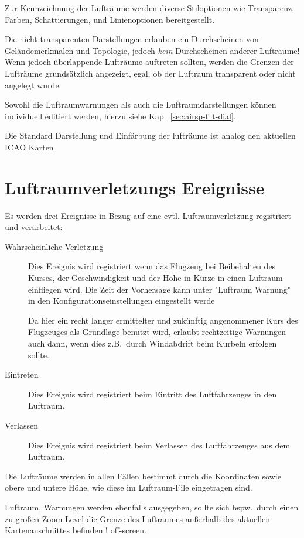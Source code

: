 Zur Kennzeichnung der Lufträume werden diverse Stiloptionen wie Transparenz, Farben,
Schattierungen, und Linienoptionen bereitgestellt. 

Die nicht-transparenten  Darstellungen erlauben ein Durchscheinen von
Geländemerkmalen und Topologie, jedoch \emph{kein} Durchscheinen anderer Lufträume!
Wenn jedoch überlappende Lufträume auftreten sollten, werden die Grenzen der
Lufträume grundsätzlich angezeigt, egal, ob der Luftraum transparent oder nicht angelegt wurde.

Sowohl die Luftraumwarnungen als auch die Luftraumdarstellungen können individuell editiert werden,
hierzu siehe Kap.~\ref{sec:airsp-filt-dial}.

Die Standard Darstellung und Einfärbung der lufträume ist analog den aktuellen ICAO Karten

\section{Luftraumverletzungs Ereignisse}

Es werden drei Ereignisse in Bezug auf eine evtl. Luftraumverletzung  registriert und verarbeitet:
\begin{description}
\item[Wahrscheinliche Verletzung] Dies Ereignis wird registriert
wenn das Flugzeug bei Beibehalten des Kurses, der Geschwindigkeit und der Höhe in Kürze in einen Luftraum einfliegen wird.
Die Zeit der Vorhersage kann unter "Luftraum Warnung" in den Konfigurationseinstellungen eingestellt werde

Da hier ein recht langer ermittelter und zukünftig angenommener Kurs des Flugzeuges als
 Grundlage benutzt wird, erlaubt \xc rechtzeitige Warnungen auch dann, wenn dies z.B.\
 durch Windabdrift beim Kurbeln erfolgen sollte.
\item[Eintreten] Dies Ereignis wird registriert beim Eintritt des Luftfahrzeuges in den Luftraum.
\item[Verlassen] Dies Ereignis wird registriert beim Verlassen des Luftfahrzeuges aus dem Luftraum.
\end{description}
Die Lufträume werden in allen Fällen bestimmt durch die Koordinaten sowie obere und
untere Höhe, wie diese im Luftraum-File eingetragen sind.

Luftraum, Warnungen werden ebenfalls ausgegeben, sollte sich bspw.\ durch einen zu großen Zoom-Level
 die  Grenze des Luftraumes außerhalb des aktuellen Kartenauschnittes befinden !
off-screen.

